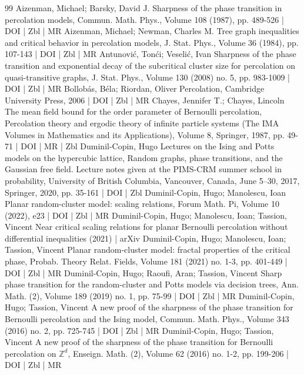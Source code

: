 \begin{thebibliography}{99}
 Aizenman, Michael; Barsky, David J. Sharpness of the phase transition in percolation models, Commun. Math. Phys., Volume 108 (1987), pp. 489-526 | DOI | Zbl | MR
 Aizenman, Michael; Newman, Charles M. Tree graph inequalities and critical behavior in percolation models, J. Stat. Phys., Volume 36 (1984), pp. 107-143 | DOI | Zbl | MR
 Antunović, Tonći; Veselić, Ivan Sharpness of the phase transition and exponential decay of the subcritical cluster size for percolation on quasi-transitive graphs, J. Stat. Phys., Volume 130 (2008) no. 5, pp. 983-1009 | DOI | Zbl | MR
 Bollobás, Béla; Riordan, Oliver Percolation, Cambridge University Press, 2006 | DOI | Zbl | MR
 Chayes, Jennifer T.; Chayes, Lincoln The mean field bound for the order parameter of Bernoulli percolation, Percolation theory and ergodic theory of infinite particle systems (The IMA Volumes in Mathematics and its Applications), Volume 8, Springer, 1987, pp. 49-71 | DOI | MR | Zbl
 Duminil-Copin, Hugo Lectures on the Ising and Potts models on the hypercubic lattice, Random graphs, phase transitions, and the Gaussian free field. Lecture notes given at the PIMS-CRM summer school in probability, University of British Columbia, Vancouver, Canada, June 5–30, 2017, Springer, 2020, pp. 35-161 | DOI | Zbl
 Duminil-Copin, Hugo; Manolescu, Ioan Planar random-cluster model: scaling relations, Forum Math. Pi, Volume 10 (2022), e23 | DOI | Zbl | MR
 Duminil-Copin, Hugo; Manolescu, Ioan; Tassion, Vincent Near critical scaling relations for planar Bernoulli percolation without differential inequalities (2021) | arXiv
 Duminil-Copin, Hugo; Manolescu, Ioan; Tassion, Vincent Planar random-cluster model: fractal properties of the critical phase, Probab. Theory Relat. Fields, Volume 181 (2021) no. 1-3, pp. 401-449 | DOI | Zbl | MR
 Duminil-Copin, Hugo; Raoufi, Aran; Tassion, Vincent Sharp phase transition for the random-cluster and Potts models via decision trees, Ann. Math. (2), Volume 189 (2019) no. 1, pp. 75-99 | DOI | Zbl | MR
 Duminil-Copin, Hugo; Tassion, Vincent A new proof of the sharpness of the phase transition for Bernoulli percolation and the Ising model, Commun. Math. Phys., Volume 343 (2016) no. 2, pp. 725-745 | DOI | Zbl | MR
 Duminil-Copin, Hugo; Tassion, Vincent A new proof of the sharpness of the phase transition for Bernoulli percolation on $\mathbb{Z}^d$, Enseign. Math. (2), Volume 62 (2016) no. 1-2, pp. 199-206 | DOI | Zbl | MR

\end{thebibliography}
